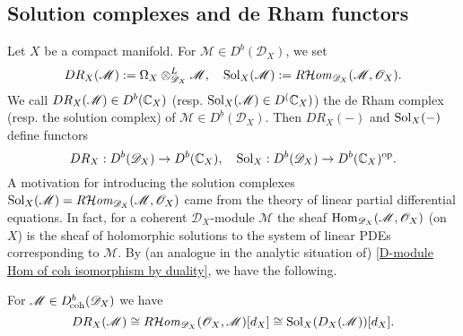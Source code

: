 \subsection{Solution complexes and de Rham functors}
Let $X$ be a compact manifold. For $\mathscr{M}\in D^b(\mathscr{D}_X)$, we set
\[DR_X(\mathscr{M}):=\Omega_X\otimes_{\mathscr{D}_X}^L\mathscr{M},\quad \mathrm{Sol}_X(\mathscr{M}):=R\!\operatorname{\mathcal{H}\hspace*{-0.4pt}\textit{om}\hspace{0.5pt}}_{\mathscr{D}_X}(\mathscr{M},\mathscr{O}_X).\]
We call $DR_X(\mathscr{M})\in D^b(\mathbb{C}_X)$ (resp. $\mathrm{Sol}_X(\mathscr{M})\in D^(\mathbb{C}_X)$) the de Rham complex (resp. the solution complex) of $\mathscr{M}\in D^b(\mathscr{D}_X)$. Then $DR_X(-)$ and $\mathrm{Sol}_X(-)$ define functors
\[DR_X:D^b(\mathscr{D}_X)\to D^b(\mathbb{C}_X),\quad \mathrm{Sol}_X:D^b(\mathscr{D}_X)\to D^b(\mathbb{C}_X)^{\mathrm{op}}.\]
A motivation for introducing the solution complexes $\mathrm{Sol}_X(\mathscr{M})=R\!\operatorname{\mathcal{H}\hspace*{-0.4pt}\textit{om}\hspace{0.5pt}}_{\mathscr{D}_X}(\mathscr{M},\mathscr{O}_X)$ came from the theory of linear partial differential equations. In fact, for a coherent $\mathscr{D}_X$-module $\mathscr{M}$ the sheaf $\mathrm{Hom}_{\mathscr{D}_X}(\mathscr{M},\mathscr{O}_X)$ (on $X$) is the sheaf of holomorphic solutions to the system of linear PDEs corresponding to $\mathscr{M}$. By (an analogue in the analytic situation of) \cref{D-module Hom of coh isomorphism by duality}, we have the following.

\begin{proposition}\label{D-module analytic DR and Sol duality relation}
For $\mathscr{M}\in D^b_{\!\mathrm{coh}}(\mathscr{D}_X)$ we have
\[DR_X(\mathscr{M})\cong R\!\operatorname{\mathcal{H}\hspace*{-0.4pt}\textit{om}\hspace{0.5pt}}_{\mathscr{D}_X}(\mathscr{O}_X,\mathscr{M})[d_X]\cong \mathrm{Sol}_X(D_X(\mathscr{M}))[d_X].\]
\end{proposition}

